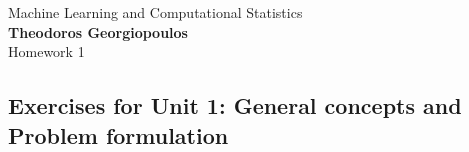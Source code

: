 \documentclass[12pt]{book}
\begin{document}
\begin{center}
{\Large Machine Learning and Computational Statistics}\\
\large\textbf{Theodoros Georgiopoulos}\\ %
\Large Homework 1 %
\end{center}

\vspace{0.2 cm}


\subsection*{Exercises for Unit 1: General concepts and Problem formulation}

\vspace{0.2 cm}
\end{document}
